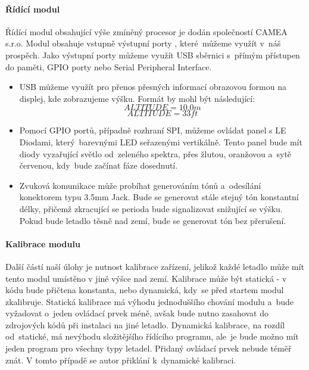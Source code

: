 			\paragraph{Řídící modul}
				Řídící modul obsahující výše zmíněný procesor je dodán společností CAMEA s.r.o. Modul obsahuje vstupně výstupní porty , které~můžeme využít v~náš prospěch. Jako výstupní porty můžeme využít USB sběrnici s~přímým přístupen do paměti, GPIO porty nebo Serial Peripheral Interface. 
				\begin{itemize}
					\item USB můžeme využít pro přenos přesných informací obrazovou formou na displej, kde zobrazujeme výšku. Formát by mohl být následující: \[ALTITUDE = 10.0 m\]\[ALTITUDE = 33 ft\]
					
					\item Pomocí GPIO portů, případně rozhraní SPI, můžeme ovládat panel s LE Diodami, který~barevnými LED seřazenými vertikálně. Tento panel bude mít diody vyzařující světlo od~zeleného spektra, přes žlutou, oranžovou a~sytě červenou, kdy~bude začínat fáze dosednutí.
					
					\item Zvuková komunikace může probíhat generováním tónů a~odesílání konektorem typu 3.5mm Jack. Bude se generovat stále stejný tón konstantní délky, přičemž zkracující se perioda bude signalizovat snižující se výšku. Pokud bude letadlo těsně nad zemí, bude se generovat tón bez přerušení.
				\end{itemize}
			
			\paragraph{Kalibrace modulu}
				Další částí naší úlohy je nutnost kalibrace zařízení, jelikož každé letadlo může mít tento modul umístěno v jiné výšce nad zemí. Kalibrace může být statická - v kódu bude přičtena konstanta, nebo dynamická, kdy~se před startem modul zkalibruje. Statická kalibrace má výhodu jednoduššího chování modulu a~bude vyžadovat o~jeden ovládací prvek méně, avšak bude nutno zasahovat do zdrojových kódů při instalaci na jiné letadlo. Dynamická kalibrace, na rozdíl od~statické, má nevýhodu složitějšího řídícího programu, ale~je bude možno mít jeden program pro všechny typy letadel. Přidaný ovládací prvek nebude téměř znát. V tomto případě se autor přiklání k~dynamické kalibraci.
				
